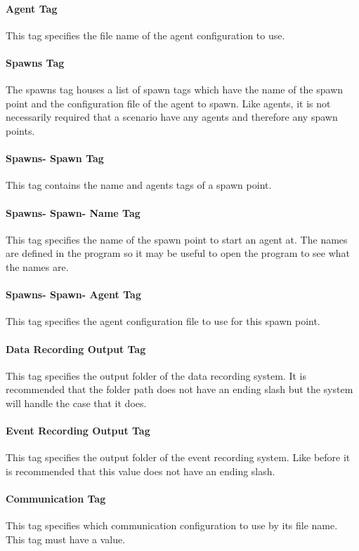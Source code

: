 \documentclass[../main.tex]{subfiles}
\begin{document}
\paragraph{Agent Tag}
This tag specifies the file name of the agent configuration to use.

\paragraph{Spawns Tag}
The spawns tag houses a list of spawn tags which have the name of the spawn point and the configuration file of the agent to spawn.
Like agents, it is not necessarily required that a scenario have any agents and therefore any spawn points.

\paragraph{Spawns- Spawn Tag}
This tag contains the name and agents tags of a spawn point.

\paragraph{Spawns- Spawn- Name Tag}
This tag specifies the name of the spawn point to start an agent at.
The names are defined in the program so it may be useful to open the program to see what the names are.

\paragraph{Spawns- Spawn- Agent Tag}
This tag specifies the agent configuration file to use for this spawn point.

\paragraph{Data Recording Output Tag}
This tag specifies the output folder of the data recording system.
It is recommended that the folder path does not have an ending slash but the system will handle the case that it does.

\paragraph{Event Recording Output Tag}
This tag specifies the output folder of the event recording system.
Like before it is recommended that this value does not have an ending slash.

\paragraph{Communication Tag}
This tag specifies which communication configuration to use by its file name.
This tag must have a value.
\end{document}
